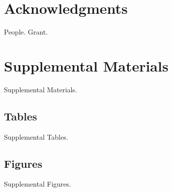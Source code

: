 \documentclass[12pt]{article}
\newcommand{\beginsupplement}{%
	\setcounter{table}{0}
	\renewcommand{\thetable}{S\arabic{table}}%
	\setcounter{figure}{0}
	\renewcommand{\thefigure}{S\arabic{figure}}%
}
\begin{document}
\section*{Acknowledgments}
\label{sec:ack}
People. Grant.



\pagebreak
\printbibliography
\pagebreak


\section{Supplemental Materials}
\label{sec:supp-materials}
\beginsupplement
Supplemental Materials.



\subsection{Tables}
\label{ssec:supp-tables}
Supplemental Tables.


\subsection{Figures}
\label{ssec:supp-figures}
Supplemental Figures.
\end{document}
